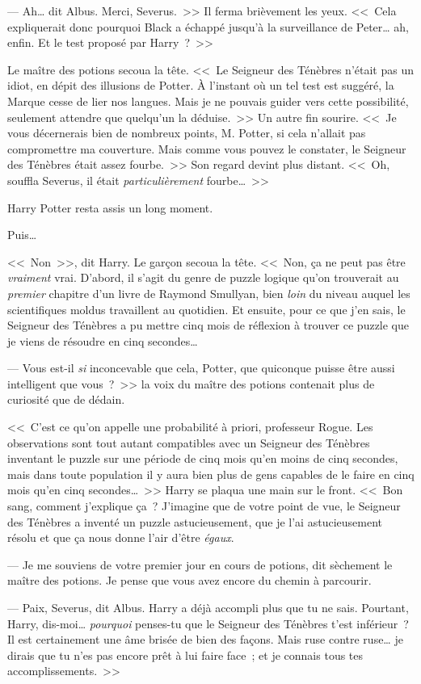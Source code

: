 --- Ah… dit Albus. Merci, Severus.~>> Il ferma brièvement les yeux. <<~Cela expliquerait donc pourquoi Black a échappé jusqu'à la surveillance de Peter… ah, enfin. Et le test proposé par Harry~?~>>

Le maître des potions secoua la tête. <<~Le Seigneur des Ténèbres n'était pas un idiot, en dépit des illusions de Potter. À l'instant où un tel test est suggéré, la Marque cesse de lier nos langues. Mais je ne pouvais guider vers cette possibilité, seulement attendre que quelqu'un la déduise.~>> Un autre fin sourire. <<~Je vous décernerais bien de nombreux points, M. Potter, si cela n'allait pas compromettre ma couverture. Mais comme vous pouvez le constater, le Seigneur des Ténèbres était assez fourbe.~>> Son regard devint plus distant. <<~Oh, souffla Severus, il était \emph{particulièrement} fourbe…~>>

Harry Potter resta assis un long moment.

Puis…

<<~Non~>>, dit Harry. Le garçon secoua la tête. <<~Non, ça ne peut pas être \emph{vraiment} vrai. D'abord, il s'agit du genre de puzzle logique qu'on trouverait au \emph{premier} chapitre d'un livre de Raymond Smullyan, bien \emph{loin} du niveau auquel les scientifiques moldus travaillent au quotidien. Et ensuite, pour ce que j'en sais, le Seigneur des Ténèbres a pu mettre cinq mois de réflexion à trouver ce puzzle que je viens de résoudre en cinq secondes…

--- Vous est-il \emph{si} inconcevable que cela, Potter, que quiconque puisse être aussi intelligent que vous~?~>> la voix du maître des potions contenait plus de curiosité que de dédain.

<<~C'est ce qu'on appelle une probabilité à priori, professeur Rogue. Les observations sont tout autant compatibles avec un Seigneur des Ténèbres inventant le puzzle sur une période de cinq mois qu'en moins de cinq secondes, mais dans toute population il y aura bien plus de gens capables de le faire en cinq mois qu'en cinq secondes…~>> Harry se plaqua une main sur le front. <<~Bon sang, comment j'explique ça~? J'imagine que de votre point de vue, le Seigneur des Ténèbres a inventé un puzzle astucieusement, que je l'ai astucieusement résolu et que ça nous donne l'air d'être \emph{égaux}.

--- Je me souviens de votre premier jour en cours de potions, dit sèchement le maître des potions. Je pense que vous avez encore du chemin à parcourir.

--- Paix, Severus, dit Albus. Harry a déjà accompli plus que tu ne sais. Pourtant, Harry, dis-moi… \emph{pourquoi} penses-tu que le Seigneur des Ténèbres t'est inférieur~? Il est certainement une âme brisée de bien des façons. Mais ruse contre ruse… je dirais que tu n'es pas encore prêt à lui faire face~; et je connais tous tes accomplissements.~>>

